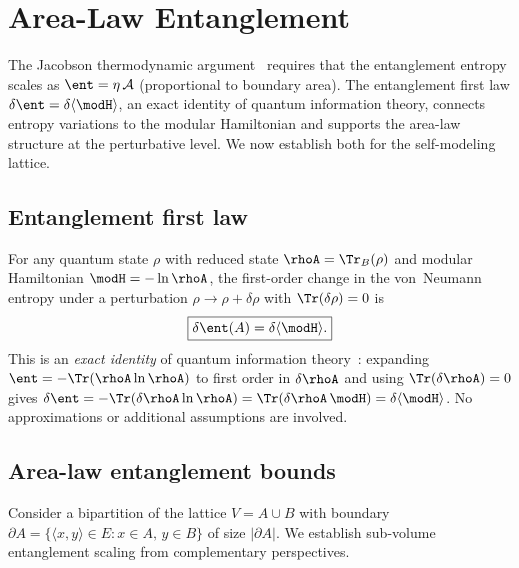 \section{Area-Law Entanglement}
\label{sec:arealaw}

The Jacobson thermodynamic argument~\cite{Jacobson1995} requires that
the entanglement entropy scales as $\ent = \eta\,\mathcal{A}$ (proportional
to boundary area).  The entanglement first law
$\delta\ent = \delta\langle\modH\rangle$, an exact identity of quantum
information theory, connects entropy variations to the modular
Hamiltonian and supports the area-law structure at the perturbative
level.  We now establish both for the self-modeling lattice.

\subsection{Entanglement first law}
\label{sec:first-law}

For any quantum state $\rho$ with reduced state
$\rhoA = \Tr_B(\rho)$ and modular Hamiltonian
$\modH = -\ln \rhoA$, the first-order change in the von~Neumann
entropy under a perturbation $\rho \to \rho + \delta\rho$ with
$\Tr(\delta\rho) = 0$ is
\begin{equation}
  \boxed{\delta \ent(A) = \delta\langle \modH \rangle.}
  \label{eq:first-law}
\end{equation}
This is an \emph{exact identity} of quantum information
theory~\cite{BCHM2013, LMVR2014}: expanding
$\ent = -\Tr(\rhoA \ln \rhoA)$ to first order in $\delta\rhoA$ and
using $\Tr(\delta\rhoA) = 0$ gives
$\delta\ent = -\Tr(\delta\rhoA \ln\rhoA) = \Tr(\delta\rhoA \, \modH)
= \delta\langle\modH\rangle$.  No approximations or additional
assumptions are involved.

\subsection{Area-law entanglement bounds}
\label{sec:area-bounds}

Consider a bipartition of the lattice $V = A \cup B$ with boundary
$\partial A = \{\langle x,y \rangle \in E : x \in A,\, y \in B\}$ of
size $|\partial A|$.  We establish sub-volume entanglement scaling from
complementary perspectives.

